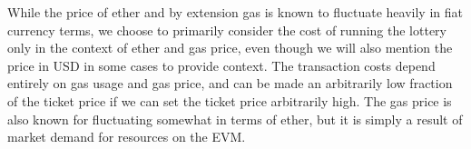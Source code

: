 While the price of ether and by extension gas is known to fluctuate heavily in fiat currency terms, we choose to primarily consider the cost of running the lottery only in the context of ether and gas price, even though we will also mention the price in USD in some cases to provide context. The transaction costs depend entirely on gas usage and gas price, and can be made an arbitrarily low fraction of the ticket price if we can set the ticket price arbitrarily high. The gas price is also known for fluctuating somewhat in terms of ether, but it is simply a result of market demand for resources on the EVM.
